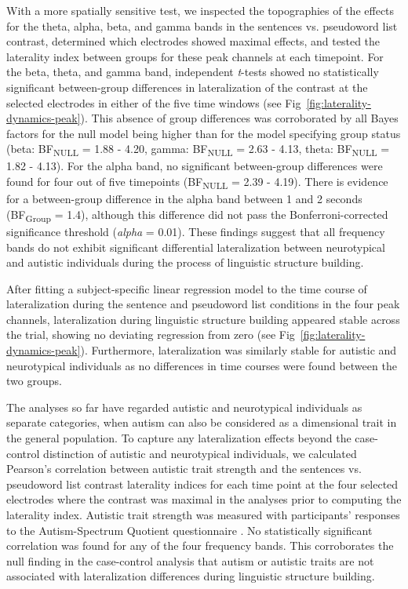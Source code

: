 With a more spatially sensitive test, we inspected the topographies of the effects for the theta, alpha, beta, and gamma bands in the sentences vs. pseudoword list contrast, determined which electrodes showed maximal effects, and tested the laterality index between groups for these peak channels at each timepoint. For the beta, theta, and gamma band, independent \textit{t}-tests showed no statistically significant between-group differences in lateralization of the contrast at the selected electrodes in either of the five time windows (see Fig~\ref{fig:laterality-dynamics-peak}). This absence of group differences was corroborated by all Bayes factors for the null model being higher than for the model specifying group status (beta: BF\textsubscript{NULL} = 1.88 - 4.20, gamma: BF\textsubscript{NULL} = 2.63 - 4.13, theta: BF\textsubscript{NULL} = 1.82 - 4.13). For the alpha band, no significant between-group differences were found for four out of five timepoints (BF\textsubscript{NULL} = 2.39 - 4.19). There is evidence for a between-group difference in the alpha band between 1 and 2 seconds (BF\textsubscript{Group} = 1.4), although this difference did not pass the Bonferroni-corrected significance threshold (\textit{alpha}  = 0.01). These findings suggest that all frequency bands do not exhibit significant differential lateralization between neurotypical and autistic individuals during the process of linguistic structure building. 

After fitting a subject-specific linear regression model to the time course of lateralization during the sentence and pseudoword list conditions in the four peak channels, lateralization during linguistic structure building appeared stable across the trial, showing no deviating regression from zero (see Fig~\ref{fig:laterality-dynamics-peak}). Furthermore, lateralization was similarly stable for autistic and neurotypical individuals as no differences in time courses were found between the two groups. 

The analyses so far have regarded autistic and neurotypical individuals as separate categories, when autism can also be considered as a dimensional trait in the general population. To capture any lateralization effects beyond the case-control distinction of autistic and neurotypical individuals, we calculated Pearson's correlation between autistic trait strength and the sentences vs. pseudoword list contrast laterality indices for each time point at the four selected electrodes where the contrast was maximal in the analyses prior to computing the laterality index. Autistic trait strength was measured with participants' responses to the Autism-Spectrum Quotient questionnaire \citep[AQ;][]{baron-cohen2001AQ}. No statistically significant correlation was found for any of the four frequency bands. This corroborates the null finding in the case-control analysis that autism or autistic traits are not associated with lateralization differences during linguistic structure building. 

